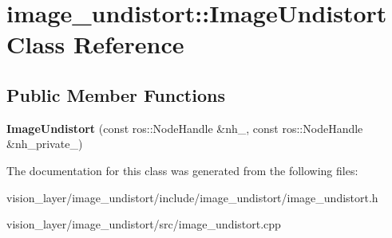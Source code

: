 \hypertarget{classimage__undistort_1_1ImageUndistort}{}\section{image\+\_\+undistort\+:\+:Image\+Undistort Class Reference}
\label{classimage__undistort_1_1ImageUndistort}
\subsection*{Public Member Functions}
\begin{DoxyCompactItemize}
\item 
\mbox{\label{classimage__undistort_1_1ImageUndistort_ab3b6622d4eaee133af34a4b786cccc38}} 
{\bfseries Image\+Undistort} (const ros\+::\+Node\+Handle \&nh\+\_\+, const ros\+::\+Node\+Handle \&nh\+\_\+private\+\_\+)
\end{DoxyCompactItemize}


The documentation for this class was generated from the following files\+:\begin{DoxyCompactItemize}
\item 
vision\+\_\+layer/image\+\_\+undistort/include/image\+\_\+undistort/image\+\_\+undistort.\+h\item 
vision\+\_\+layer/image\+\_\+undistort/src/image\+\_\+undistort.\+cpp\end{DoxyCompactItemize}
